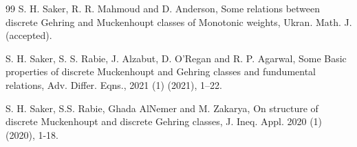 \documentclass[a4paper]{amsart}
\theoremstyle{plain}
\numberwithin{equation}{section}
\begin{document}
\begin{thebibliography}{99}
 S. H. Saker, R. R. Mahmoud and D. Anderson, Some
relations between discrete Gehring and Muckenhoupt classes of Monotonic
weights, Ukran. Math. J. (accepted).

 S. H. Saker, S. S. Rabie, J. Alzabut, D. O'Regan and R. P.
Agarwal, Some Basic properties of discrete Muckenhoupt and Gehring classes
and fundumental relations, Adv. Differ. Eqns., 2021 (1) (2021), 1--22.

 S. H. Saker, S.S. Rabie, Ghada AlNemer and M. Zakarya,
On structure of discrete Muckenhoupt and discrete Gehring classes, J. Ineq.
Appl. 2020 (1) (2020), 1-18.
\end{thebibliography}
\end{document}
